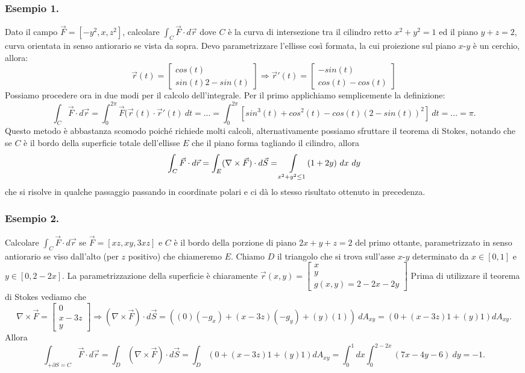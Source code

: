 \documentclass[10pt]{article}
\theoremstyle{plain}
\theoremstyle{definition}
\begin{document}
\subsubsection{Esempio 1.}
Dato il campo $\vec{F}=[-y^2,x,z^2]$, calcolare $\int_C \vec{F}\cdot d\vec{r}$ dove $C$ è la curva di intersezione tra il cilindro retto $x^2+y^2=1$ ed il piano $y+z=2$, curva orientata in senso antiorario se vista da sopra. 
Devo parametrizzare l'ellisse così formata, la cui proiezione sul piano $x$-$y$ è un cerchio, allora:
$$\vec{r}(t)=\begin{bmatrix}
cos(t)
\\ sin (t)
2-sin(t)
\end{bmatrix}\Rightarrow
\vec{r}'(t)=\begin{bmatrix}
-sin(t)
\\ cos (t)
-cos(t)
\end{bmatrix}
$$
Possiamo procedere ora in due modi per il calcolo dell'integrale. Per il primo applichiamo semplicemente la definizione:
$$
\int_C\vec{F} \cdot d\vec{r} =\int_0^{2\pi} \vec{F}(\vec{r}(t) \cdot \vec{r}'(t)\ dt= ...=\int_0^{2\pi} [sin^3(t)+cos^2(t)-cos(t)(2-sin(t))^2]\ dt= ...=\pi.
$$
Questo metodo è abbastanza scomodo poiché richiede molti calcoli, alternativamente possiamo sfruttare il teorema di Stokes, notando che se $C$ è il bordo della superficie totale dell'ellisse $E$ che il piano forma tagliando il cilindro, allora
$$ \int_C\vec{F} \cdot d\vec{r} = \int_E(\nabla \times \vec{F} )\cdot d\vec{S}=\int\displaylimits_{x^2+y^2\leq 1} (1+2y)\ dx\ dy
$$ che si risolve in qualche passaggio passando in coordinate polari e ci dà lo stesso risultato ottenuto in precedenza.

\subsubsection{Esempio 2.}
Calcolare $\int_C \vec{F}\cdot d\vec{r}$ se $\vec{F}=[xz,xy,3xz]$ e $C$ è il bordo della porzione di piano $2x+y+z=2$ del primo ottante, parametrizzato in senso antiorario se viso dall'alto (per $z$ positivo) che chiameremo $E$. Chiamo $D$ il triangolo che si trova sull'asse $x$-$y$ determinato da $x\in [0,1]$ e $y\in [0,2-2x]$.
La parametrizzazione della superficie è chiaramente
$\vec{r}(x,y)=\begin{bmatrix}
x\\ y \\ g(x,y)=2-2x-2y\end{bmatrix}$
Prima di utilizzare il teorema di Stokes vediamo che 
$$\nabla \times \vec{F}=\begin{bmatrix}
0\\ x-3z \\ y\end{bmatrix} \Rightarrow 
(\nabla \times \vec{F})\cdot d\vec{S}=((0)(-g_x)+(x-3z)(-g_y)+(y)(1))\ dA_{xy}=
(0+(x-3z)1+(y)1) dA_{xy}.
$$
Allora
$$ \int_{+\partial S =C} \vec{F}\cdot d\vec{r} = \int_D (\nabla \times \vec{F})\cdot d\vec{S}=  \int_D (0+(x-3z)1+(y)1) dA_{xy}=\int_0^1dx \int_0^{2-2x}(7x-4y-6)\ dy =-1.
$$
\end{document}
